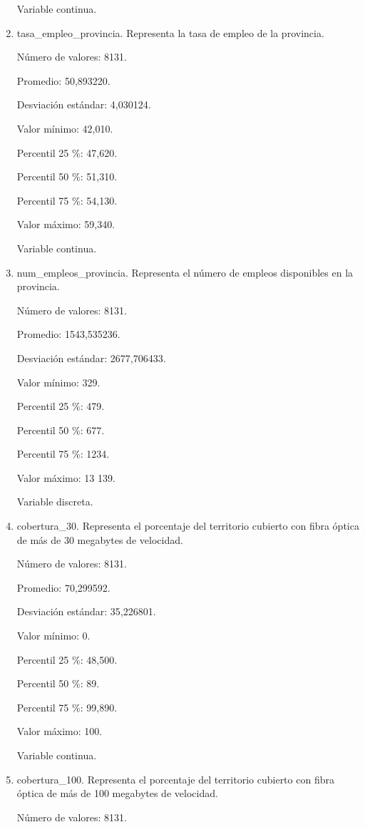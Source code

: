 \begin{enumerate}
	Variable continua.

	\item tasa\_empleo\_provincia. Representa la tasa de empleo de la provincia.
	
	Número de valores: 8131.
	
	Promedio: 50,893220.
	
	Desviación estándar: 4,030124.
	
	Valor mínimo: 42,010.
	
	Percentil 25 \%: 47,620.
	
	Percentil 50 \%: 51,310.
	
	Percentil 75 \%: 54,130.
	
	Valor máximo: 59,340.
	
	Variable continua.

	\item num\_empleos\_provincia. Representa el número de empleos disponibles en la provincia.
	
	Número de valores: 8131.
	
	Promedio: 1543,535236.
	
	Desviación estándar: 2677,706433.
	
	Valor mínimo: 329.
	
	Percentil 25 \%: 479.
	
	Percentil 50 \%: 677.
	
	Percentil 75 \%: 1234.
	
	Valor máximo: 13 139.
	
	Variable discreta.

	\item cobertura\_30. Representa el porcentaje del territorio cubierto con fibra óptica de más de 30 megabytes de velocidad.
	
	Número de valores: 8131.
	
	Promedio: 70,299592.
	
	Desviación estándar: 35,226801.
	
	Valor mínimo: 0.
	
	Percentil 25 \%: 48,500.
	
	Percentil 50 \%: 89.
	
	Percentil 75 \%: 99,890.
	
	Valor máximo: 100.
	
	Variable continua.

	\item cobertura\_100. Representa el porcentaje del territorio cubierto con fibra óptica de más de 100 megabytes de velocidad.
	
	Número de valores: 8131.
	

\end{enumerate}
